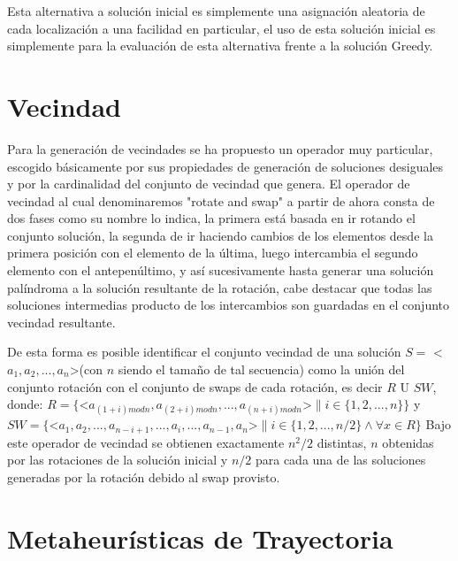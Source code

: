 \documentclass{ci5652}
\begin{document}
Esta alternativa a solución inicial es simplemente una asignación aleatoria de cada localización a una facilidad en particular, el uso de esta solución inicial es simplemente para la evaluación de esta alternativa frente a la solución Greedy.  

\section{Vecindad}

Para la generación de vecindades se ha propuesto un operador muy particular, escogido básicamente por sus propiedades de generación de soluciones desiguales y por la cardinalidad del conjunto de vecindad que genera. El operador de vecindad al cual denominaremos "rotate and swap" a partir de ahora consta de dos fases como su nombre lo indica, la primera está basada en ir rotando el conjunto solución, la segunda de ir haciendo cambios de los elementos desde la primera posición con el elemento de la última, luego intercambia el segundo elemento con el antepenúltimo, y así sucesivamente hasta generar una solución palíndroma a la solución resultante de la rotación, cabe destacar que todas las soluciones intermedias producto de los intercambios son guardadas en el conjunto vecindad resultante.

De esta forma es posible identificar el conjunto vecindad de una solución \(S =\) \textless \(a_{1}, a_{2}, ..., a_{n}\)\textgreater \space (con \(n\) siendo el tamaño de tal secuencia) como la unión del conjunto rotación con el conjunto de swaps de cada rotación, es decir \(R\) U \(SW\), donde:
\newline
\(R = \{\)\textless \(a_{(1+i) mod n}, a_{(2+i) mod n}, ..., a_{(n+i) mod n}\)\textgreater \( \| i\in\{ 1, 2, ..., n\} \}\) 
\newline
y 
\newline
\(SW = \{ \)\textless \(a_{1}, a_{2}, ..., a_{n-i+1}, ..., a_{i}, ..., a_{n-1}, a_{n}\)\textgreater \( \| i\in\{ 1, 2, ..., n/2\} \wedge \forall x\in R \}   \)
\newline
Bajo este operador de vecindad se obtienen exactamente \(n^{2}/2\) distintas, \(n\) obtenidas por las rotaciones de la solución inicial y \(n/2\) para cada una de las soluciones generadas por la rotación debido al swap provisto.


\section{Metaheurísticas de Trayectoria}
\end{document}
